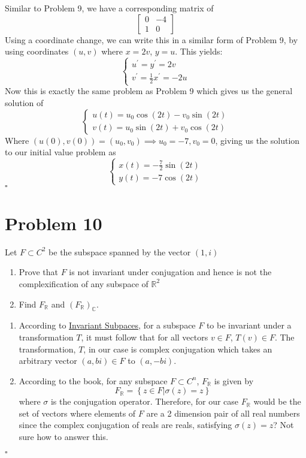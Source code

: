 \documentclass[11pt]{article}
\newcommand{\C}{\mathbb{C}}
\newcommand{\R}{\mathbb{R}}
\newcommand{\set}[1]{\left\{ #1\right\}}
\newenvironment{proof}{\noindent{\bf Proof.}}{\hfill $\square$\medskip}
\begin{document}
\begin{proof}
Similar to Problem 9, we have a corresponding matrix of
$$\begin{bmatrix}
    0&-4\\
    1&0
\end{bmatrix}$$
Using a coordinate change, we can write this in a similar form of Problem 9, by using coordinates $(u,v)$
where $x=2v$, $y=u$. This yields:
$$\begin{cases}
    u^{\prime}=y^{\prime}=2v\\
    v^{\prime}=\frac{1}{2}x^{\prime}=-2u
\end{cases}$$
Now this is exactly the same problem as Problem 9 which gives us the general solution of
$$\begin{cases}
    u(t)=u_{0}\cos(2t)-v_{0}\sin(2t)\\
    v(t)=u_{0}\sin(2t)+v_{0}\cos(2t)
\end{cases}$$
Where $(u(0),v(0))=(u_{0},v_{0})\implies u_{0}=-7,v_{0}=0$, giving us the solution to our initial value problem as
$$\begin{cases}
    x(t)=-\frac{7}{2}\sin(2t)\\
    y(t)=-7\cos(2t)
\end{cases}$$
\end{proof}

\section{Problem 10}
Let $F\subset C^{2}$ be the subspace spanned by the vector $(1,i)$
\begin{enumerate}[label=(\alph*)]
    \item Prove that $F$ is not invariant under conjugation and hence is not
          the complexification of any subspace of $\R^{2}$
    \item Find $F_{\R}$ and $(F_{\R})_{\C}$.
\end{enumerate}

\begin{proof}
    \begin{enumerate}[label=(\alph*)]
        \item According to \href{https://en.wikipedia.org/wiki/Invariant_subspace}{Invariant Subpaces}, for a
        subspace $F$ to be invariant under a transformation $T$, it must follow that for all vectors $v\in F$,
        $T(v)\in F$. The transformation, $T$, in our case is complex conjugation which takes an arbitrary vector
        $(a,bi)\in F$ to $(a,-bi)$.
        \item According to the book, for any subspace $F\subset C^{n}$, $F_{\R}$ is given by
        $$F_{\R}=\set{z\in F|\sigma(z)=z}$$
        where $\sigma$ is the conjugation operator. Therefore, for our case $F_{\R}$ would be the set of vectors
        where elements of $F$ are a 2 dimension pair of all real numbers since the complex conjugation of reals 
        are reals, satisfying $\sigma(z)=z$? Not sure how to answer this.
    \end{enumerate}
\end{proof}
\end{document}
